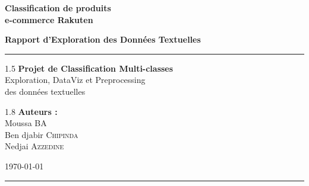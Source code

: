 \documentclass[12pt,a4paper]{article}
\begin{document}
\begin{titlepage}
    \centering
    
    \vspace*{2cm}
    
    
    \vspace{1cm}
    
    {\Huge\bfseries\color{rakutenblue}
    Classification de produits\\[0.5cm]
    e-commerce Rakuten
    }
    
    \vspace{1.5cm}
    
    {\Large\bfseries\color{darkgray}
    Rapport d'Exploration des Données Textuelles
    }
    
    \vspace{2cm}
    
    \rule{\textwidth}{1pt}
    
    \vspace{1cm}
    
    {\large
    \begin{spacing}{1.5}
    \textbf{Projet de Classification Multi-classes}\\[0.3cm]
    Exploration, DataViz et Preprocessing\\[0.3cm]
    des données textuelles
    \end{spacing}
    }
    
    \vspace{2cm}
    
    {\large\bfseries
    \begin{spacing}{1.8}
    \textbf{Auteurs :}\\[0.5cm]
    Moussa \textsc{BA}\\[0.3cm]
    Ben djabir \textsc{Chipinda}\\[0.3cm]
    Nedjai \textsc{Azzedine}
    \end{spacing}
    }
    
    \vfill
    
    {\large
    \today
    }
    
    \vspace{1cm}
    
    \rule{\textwidth}{1pt}
    
\end{titlepage}
\end{document}

